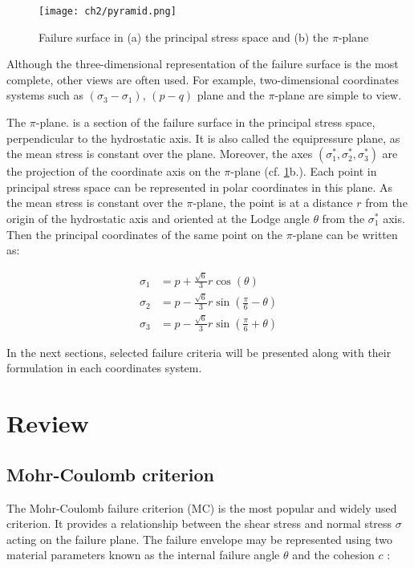 \begin{figure}[tb]
    \centering
    \texttt{[image: ch2/pyramid.png]}
    \caption{Failure surface in (a) the principal stress space and (b) the $\pi$-plane \cite{Labuz2018}}
    \label{fig2:pyramid}
\end{figure}

Although the three-dimensional representation of the failure surface is the most complete, other views are often used. For example, two-dimensional coordinates systems such as $(\sigma_3 -\sigma_1)$, $(p-q)$ plane and the $\pi$-plane are simple to view.  

The $\pi$-plane. is a section of the failure surface in the principal stress space, perpendicular to the hydrostatic axis. It is also called the equipressure plane, as the mean stress is constant over the plane. Moreover, the axes $(\sigma_1^*,\sigma_2^*,\sigma_3^*)$ are the projection of the coordinate axis on the $\pi$-plane (cf. \ref{fig2:pyramid}b.). Each point in principal stress space can be represented in polar coordinates in this plane. As the mean stress is constant over the $\pi$-plane, the point is at a distance $r$ from the origin of the hydrostatic axis and oriented at the Lodge angle $\theta$ from the  $\sigma_1^*$ axis. Then the principal coordinates of the same point on the $\pi$-plane can be written as: 

\begin{align}
    \sigma_1 &= p + \frac{\sqrt{6}}{3}r\cos\left(\theta\right) \label{eq2:sig1}\\
    \sigma_2 &= p - \frac{\sqrt{6}}{3}r\sin\left(\frac{\pi}{6}-\theta\right)\\
    \sigma_3 &= p - \frac{\sqrt{6}}{3}r\sin\left(\frac{\pi}{6}+\theta\right) \label{eq2:sig3}
\end{align}

In the next sections, selected failure criteria will be presented along with their formulation in each coordinates system. 

\section{Review}
\subsection{Mohr-Coulomb criterion}

The Mohr-Coulomb failure criterion (MC) is the most popular and widely used criterion. It provides a relationship between the shear stress and normal stress $\sigma$ acting on the failure plane. The failure envelope may be represented using two material parameters known as the internal failure angle $\theta$ and the cohesion $c$ :

